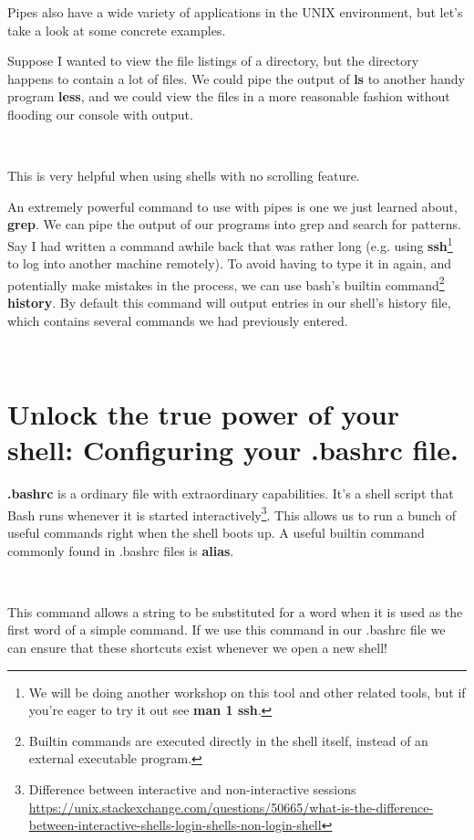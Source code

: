 \documentclass[oneside]{book}
\newcommand{\commandline}[1]{\begin{center} \colorbox{Dark}{\textcolor{white}{#1}} \end{center}}
\begin{document}
Pipes also have a wide variety of applications in the UNIX environment, but let's take a look at some concrete examples.

Suppose I wanted to view the file listings of a directory, but the directory happens to contain a lot of files. We could pipe the output of \textbf{ls} to another handy program \textbf{less}, and we could view the files in a more reasonable fashion without flooding our console with output.
\commandline{ls -al $\sim$ \textbar \ less}
\vspace{0.15}
This is very helpful when using shells with no scrolling feature.

An extremely powerful command to use with pipes is one we just learned about, \textbf{grep}. We can pipe the output of our programs into grep and search for patterns. Say I had written a command awhile back that was rather long (e.g. using \textbf{ssh}\footnote{We will be doing another workshop on this tool and other related tools, but if you're eager to try it out see \textbf{man 1 ssh}.} to log into another machine remotely). To avoid having to type it in again, and potentially make mistakes in the process, we can use bash's builtin command\footnote{Builtin commands are executed directly in the shell itself, instead of an external executable program.} \textbf{history}. By default this command will output entries in our shell's history file, which contains several commands we had previously entered.
\commandline{history \textbar \ grep [search expression]}
\vspace{0.15}

\section{Unlock the true power of your shell: Configuring your .bashrc file.}
\textbf{.bashrc} is a ordinary file with extraordinary capabilities. It's a shell script that Bash runs whenever it is started interactively\footnote{Difference between interactive and non-interactive sessions \url{https://unix.stackexchange.com/questions/50665/what-is-the-difference-between-interactive-shells-login-shells-non-login-shell}}. This allows us to run a bunch of useful commands right when the shell boots up. A useful builtin command commonly found in .bashrc files is \textbf{alias}. 
\commandline{alias [OPTIONS] \ [name[=value]...]}

This command allows a string to be substituted for a word when it is used as the first word of a simple command. If we use this command in our .bashrc file we can ensure that these shortcuts exist whenever we open a new shell! 
\end{document}
